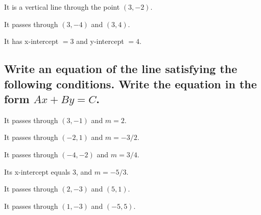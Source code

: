 \begin{puzzle}
    It is a vertical line through the point $(3, -2)$.
\end{puzzle}

\begin{puzzle}
    It passes through $(3, -4)$ and $(3, 4)$.
\end{puzzle}

\begin{puzzle}
    It has x-intercept $= 3$ and y-intercept $= 4$.
\end{puzzle}

\subsection*{Write an equation of the line satisfying the following conditions. Write the equation in the form $Ax+By = C$.}

\begin{puzzle}
    It passes through $(3, -1)$ and $m = 2$.
\end{puzzle}

\begin{puzzle}
    It passes through $(-2, 1)$ and $m = -3/2$.
\end{puzzle}

\begin{puzzle}
    It passes through $(-4, -2)$ and $m = 3/4$.
\end{puzzle}

\begin{puzzle}
    Its x-intercept equals $3$, and $m = -5/3$.
\end{puzzle}

\begin{puzzle}
    It passes through $(2, -3)$ and $(5, 1)$.
\end{puzzle}

\begin{puzzle}
    It passes through $(1, -3)$ and $(-5, 5)$.
\end{puzzle}
